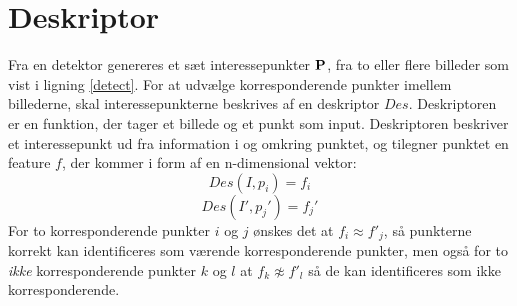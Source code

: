 \section{Deskriptor}
Fra en detektor genereres et sæt interessepunkter $\bold{P}$, fra to eller flere billeder som vist i ligning \eqref{detect}. For at udvælge korresponderende punkter imellem billederne, skal interessepunkterne beskrives af en deskriptor $Des$. Deskriptoren er en funktion, der tager et billede og et punkt som input. Deskriptoren beskriver et interessepunkt ud fra information i og omkring punktet, og tilegner punktet en feature $f$, der kommer i form af en n-dimensional vektor:
$$ Des(I,p_i)=f_i $$
$$ Des(I',p_j')=f_j' $$
For to korresponderende punkter $i$ og $j$ ønskes det at $f_i \approx f'_j$, så punkterne korrekt kan identificeres som værende korresponderende punkter, men også for to \textit{ikke} korresponderende punkter $k$ og $l$ at $f_k \not\approx f'_l$ så de kan identificeres som ikke korresponderende.